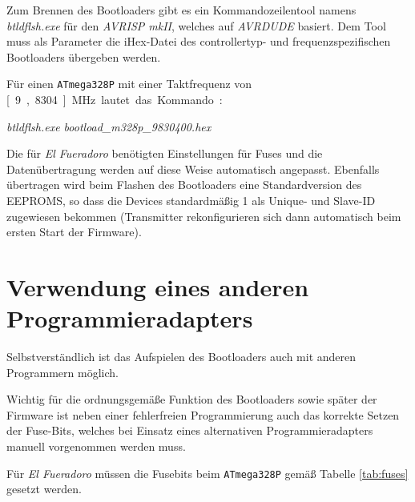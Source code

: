 \documentclass[pdftex, parskip, numbers=noenddot, toc=listof]{scrbook}
\newcommand{\anlage}{\emph{El Fueradoro}}
\begin{document}
	Zum Brennen des Bootloaders gibt es ein Kommandozeilentool namens \emph{btldflsh.exe} für den \emph{AVRISP mkII}, welches auf \emph{AVRDUDE} basiert. Dem Tool muss als Parameter die iHex-Datei des controllertyp- und frequenzspezifischen Bootloaders übergeben werden.

	Für einen \texttt{ATmega328P} mit einer Taktfrequenz von \unit[9{,}8304]{MHz} lautet das Kommando:

	\begin{center}
		\emph{btldflsh.exe bootload\_m328p\_9830400.hex}
	\end{center}

	Die für {\anlage} benötigten Einstellungen für Fuses und die Datenübertragung werden auf diese Weise automatisch angepasst. Ebenfalls übertragen wird beim Flashen des Bootloaders eine Standardversion des EEPROMS, so dass die Devices standardmäßig 1 als Unique- und Slave-ID zugewiesen bekommen (Transmitter rekonfigurieren sich dann automatisch beim ersten Start der Firmware).

	\section{Verwendung eines anderen Programmieradapters}

	Selbstverständlich ist das Aufspielen des Bootloaders auch mit anderen Programmern möglich.

	Wichtig für die ordnungsgemäße Funktion des Bootloaders sowie später der Firmware ist neben einer fehlerfreien Programmierung auch das korrekte Setzen der Fuse-Bits, welches bei Einsatz eines alternativen Programmieradapters manuell vorgenommen werden muss.

	Für {\anlage} müssen die Fusebits beim \texttt{ATmega328P} gemäß Tabelle \ref{tab:fuses} gesetzt werden.
\end{document}
